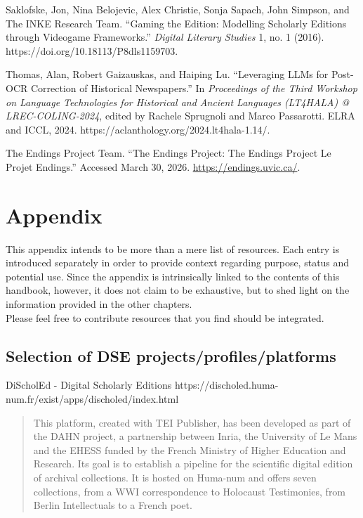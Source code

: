 \documentclass[
  letterpaper,
  DIV=11,
  numbers=noendperiod]{scrreprt}
\begin{document}
Saklofske, Jon, Nina Belojevic, Alex Christie, Sonja Sapach, John
Simpson, and The INKE Research Team. ``Gaming the Edition: Modelling
Scholarly Editions through Videogame Frameworks.'' \emph{Digital
Literary Studies} 1, no. 1 (2016).
https://doi.org/10.18113/P8dls1159703.

Thomas, Alan, Robert Gaizauskas, and Haiping Lu. ``Leveraging LLMs for
Post-OCR Correction of Historical Newspapers.'' In \emph{Proceedings of
the Third Workshop on Language Technologies for Historical and Ancient
Languages (LT4HALA) @ LREC-COLING-2024}, edited by Rachele Sprugnoli and
Marco Passarotti. ELRA and ICCL, 2024.
https://aclanthology.org/2024.lt4hala-1.14/.

The Endings Project Team. ``The Endings Project: The Endings Project
\textbar{} Le Projet Endings.'' Accessed March 30, 2026.
\href{https://endings.uvic.ca/\%5bpage\%20file\%20name\%20will\%20be\%20inserted\%20here\%5d}{https://endings.uvic.ca/}.


\chapter{Appendix}\label{appendix}

This appendix intends to be more than a mere list of resources. Each
entry is introduced separately in order to provide context regarding
purpose, status and potential use. Since the appendix is intrinsically
linked to the contents of this handbook, however, it does not claim to
be exhaustive, but to shed light on the information provided in the
other chapters.\\
Please feel free to contribute resources that you find should be
integrated.

\section{Selection of DSE
projects/profiles/platforms}\label{selection-of-dse-projectsprofilesplatforms}

DiScholEd - Digital Scholarly Editions
https://discholed.huma-num.fr/exist/apps/discholed/index.html \hl{}

\begin{quote}
This platform, created with TEI Publisher, has been developed as part of
the DAHN project, a partnership between Inria, the University of Le Mans
and the EHESS funded by the French Ministry of Higher Education and
Research. Its goal is to establish a pipeline for the scientific digital
edition of archival collections. It is hosted on Huma-num and offers
seven collections, from a WWI correspondence to Holocaust Testimonies,
from Berlin Intellectuals to a French poet.\hl{}
\end{quote}
\end{document}
